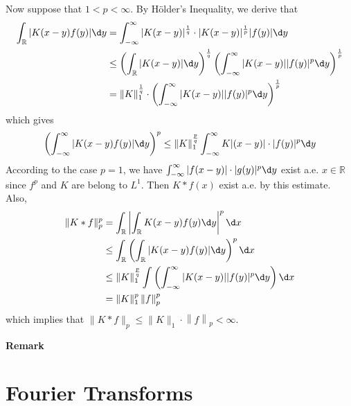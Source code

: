 \documentclass[12pt, a4paper, oneside]{book}
\begin{document}
\begin{theorem}
    Now suppose that $1<p<\infty$. By Hölder's Inequality, we derive that
    \begin{equation*}
        \begin{aligned}
            \int_\mathbb{R} |K(x-y) f(y)| \d y & =\int_{-\infty}^{\infty} |K(x-y)|^{\frac{1}{q}} \cdot |K(x-y)|^{\frac{1}{p}}| f(y)| \d y                \\
                                               & \leq\left(\int_\mathbb{R}|K(x-y)| \d y\right)^{\frac{1}{q}}
            \left(\int_{-\infty}^{\infty} |K(x-y)| |f(y)|^p  \d y\right)^{\frac{1}{p}}                                                                   \\
                                               & =\|K\|_1^{\frac{1}{q}} \cdot \left(\int_{-\infty}^{\infty} |K(x-y)| |f(y)|^p  \d y\right)^{\frac{1}{p}}
        \end{aligned}
    \end{equation*}
    which gives
    \begin{equation*}
        \left(\int_{-\infty}^{\infty}|K(x-y) f(y)| \d y\right)^p \leq\|K\|_1^{\frac{p}{q}} \int_{-\infty}^{\infty}K|(x-y)| \cdot |f(y)|^p \d y
    \end{equation*}
    According to the case $p=1$, we have $\int_{-\infty}^{\infty}|f(x-y)| \cdot|g(y)|^p \d y$ exist a.e. $x \in \mathbb{R}$ since $f^p$ and $K$ are belong to $L^1$. Then $K*f(x)$ exist a.e. by this estimate.
    Also,
    \begin{equation*}\begin{aligned}
            \|K*f\|_p^p & =  \int_{\mathbb{R}} \left|\int_\mathbb{R} K(x-y) f(y) \d y\right|^p \d x      \\
                        & \leq \int_{\mathbb{R}}\left( \int_\mathbb{R} |K(x-y) f(y)| \d y\right)^p \d x  \\
                        & \leq
            \|K\|_1^{\frac{p}{q}} \int  \left(\int_{-\infty}^{\infty} |K(x-y)| |f(y)|^p  \d y\right)\d x \\
                        & =\|K\|_1^p \left\| f \right\|_p^p
        \end{aligned}
    \end{equation*}
    which implies that $\|K* f\|_p \leq\|K\|_1 \cdot\left\| f \right\|_p<\infty$.

    \textbf{Remark}
\end{theorem}


\chapter{Fourier Transforms}
\end{document}
